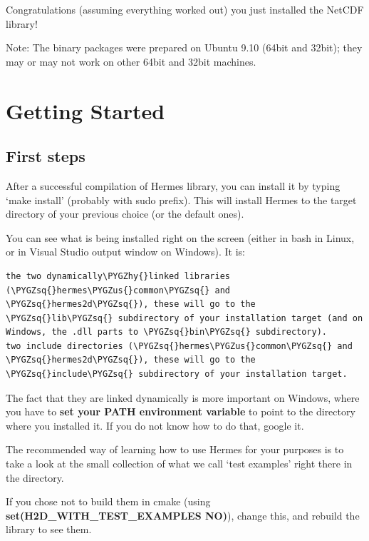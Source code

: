 \documentclass[a4paper,0pt,english]{sphinxmanual}
\def\PYGZus{\char`\_}
\def\PYGZhy{\char`\-}
\def\PYGZsq{\char`\'}
\begin{document}
Congratulations (assuming everything worked out) you just installed the NetCDF library!

Note: The binary packages were prepared on Ubuntu 9.10 (64bit and 32bit); they may or may not work on other
64bit and 32bit machines.


\chapter{Getting Started}
\label{src/documentation-start:getting-started}\label{src/documentation-start::doc}

\section{First steps}
\label{src/getting_started:first-steps}\label{src/getting_started::doc}
After a successful compilation of Hermes library, you can install it by typing `make install' (probably with sudo prefix). This will install Hermes to the target directory of your previous choice (or the default ones).

You can see what is being installed right on the screen (either in bash in Linux, or in Visual Studio output window on Windows).
It is:

\begin{Verbatim}[commandchars=\\\{\}]
the two dynamically\PYGZhy{}linked libraries (\PYGZsq{}hermes\PYGZus{}common\PYGZsq{} and \PYGZsq{}hermes2d\PYGZsq{}), these will go to the \PYGZsq{}lib\PYGZsq{} subdirectory of your installation target (and on Windows, the .dll parts to \PYGZsq{}bin\PYGZsq{} subdirectory).
two include directories (\PYGZsq{}hermes\PYGZus{}common\PYGZsq{} and \PYGZsq{}hermes2d\PYGZsq{}), these will go to the \PYGZsq{}include\PYGZsq{} subdirectory of your installation target.
\end{Verbatim}

The fact that they are linked dynamically is more important on Windows, where you have to \textbf{set your PATH environment variable} to point to the directory where you installed it.
If you do not know how to do that, google it.

The recommended way of learning how to use Hermes for your purposes is to take a look at the small collection of what we call `test examples' right there in the directory.

If you chose not to build them in cmake (using \textbf{set(H2D\_WITH\_TEST\_EXAMPLES  NO)}),
change this, and rebuild the library to see them.
\end{document}
